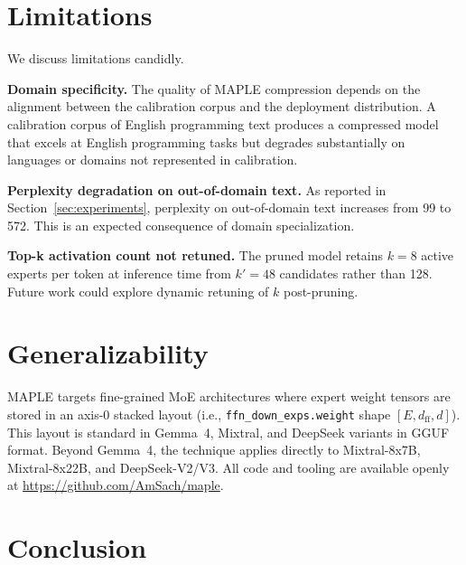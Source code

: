 \documentclass[final]{article}
\newcommand{\MAPLE}{\textsc{MAPLE}}
\begin{document}
\section{Limitations}
\label{sec:limitations}

We discuss limitations candidly.

\textbf{Domain specificity.} The quality of \MAPLE{} compression depends on the alignment between the calibration corpus and the deployment distribution. A calibration corpus of English programming text produces a compressed model that excels at English programming tasks but degrades substantially on languages or domains not represented in calibration.

\textbf{Perplexity degradation on out-of-domain text.} As reported in Section~\ref{sec:experiments}, perplexity on out-of-domain text increases from 99 to 572. This is an expected consequence of domain specialization.

\textbf{Top-k activation count not retuned.} The pruned model retains $k = 8$ active experts per token at inference time from $k' = 48$ candidates rather than 128. Future work could explore dynamic retuning of $k$ post-pruning.

\section{Generalizability}
\label{sec:generality}

\MAPLE{} targets fine-grained MoE architectures where expert weight tensors are stored in an axis-0 stacked layout (i.e., \texttt{ffn\_down\_exps.weight} shape $[E, d_\text{ff}, d]$). This layout is standard in Gemma~4, Mixtral, and DeepSeek variants in GGUF format. Beyond Gemma~4, the technique applies directly to Mixtral-8x7B, Mixtral-8x22B, and DeepSeek-V2/V3. All code and tooling are available openly at \url{https://github.com/AmSach/maple}.

\section{Conclusion}
\label{sec:conclusion}
\end{document}
